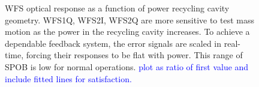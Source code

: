 \begin{figure}
\begin{centering}
\caption[Measured dependence of the WFS error signals on the power
recycling cavity geometry]{WFS optical response as a function of power
  recycling cavity geometry. WFS1Q, WFS2I, WFS2Q are more sensitive to
  test mass motion as the power in the recycling cavity increases. To
  achieve a dependable feedback system, the error signals are scaled
  in real-time, forcing their responses to be flat with power. This
  range of SPOB is low for normal operations. \textcolor{blue}{plot as
  ratio of first value and include fitted lines for satisfaction.}}
\label{fig:WFStrack}
\end{centering}
\end{figure}












